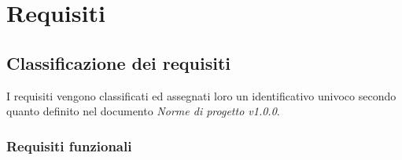 \documentclass[AnalisiDeiRequisiti.tex]{subfiles}
\begin{document}
\chapter{Requisiti}
\section{Classificazione dei requisiti}
I requisiti vengono classificati ed assegnati loro un identificativo univoco secondo quanto definito nel documento \textit{Norme di progetto v1.0.0}.


\subsection{Requisiti funzionali}
\end{document}
